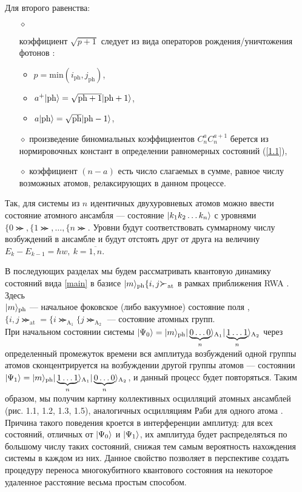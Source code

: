 Для второго равенства:
\begin{itemize}
	\item[$\diamond$]{
		коэффициент $\sqrt{p+1}$ следует из вида операторов рождения/уничтожения фотонов \cite{messia}: 
		\begin{itemize}
			\item{$p = \mathrm{min}(i_{\mathrm{ph}}, j_{\mathrm{ph}})$,}
			\item{$a^{+}|\mathrm{ph}\rangle = \sqrt{\mathrm{ph} + 1}|\mathrm{ph} + 1\rangle$,}
			\item{$a|\mathrm{ph}\rangle = \sqrt{\mathrm{ph}}|\mathrm{ph-1}\rangle$,}
		\end{itemize}
	}
	\item[$\diamond$]{ 
		произведение биномиальных коэффициентов $C_{n}^{a}C_{n}^{a+1}$ берется из нормировочных констант в определении 	равномерных состояний (\ref{1.1})},
	\item[$\diamond$]{
		коэффициент $(n-a)$ есть число слагаемых в сумме, равное числу возможных атомов, релаксирующих в данном процессе.}
\end{itemize}

Так, для системы из $n$ идентичных двухуровневых атомов можно ввести состояние атомного ансамбля --- состояние $|k_{1}k_{2}\dots k_{n}\rangle$ с уровнями $\{0\Succ, \{1\Succ, \dots, \{n\Succ$. Уровни будут соответствовать суммарному числу возбуждений в ансамбле и будут отстоять друг от друга на величину $E_{k} - E_{k-1} = \hbar w,\ k = \overline{1,n}$.

В последующих разделах мы будем рассматривать квантовую динамику состояний вида \eqref{main} в базисе $|m\ra_{\mathrm{ph}}\{i,j\Succ_{\mathrm{at}}$ в рамках приближения RWA \cite{ozhigov_qq,rwa_rabi_1,rwa_rabi_2}.
\\
\noindent Здесь\\
\indent$|m\rangle_{\mathrm{ph}}$ --- начальное фоковское (либо вакуумное) состояние поля \cite{landau,belousov,messia},
\\[6pt]
\indent$\{i,j\Succ_{\mathrm{at}}\!=\!\{i\Succ_{\mathrm{A_{1}}}\{j\Succ_{\mathrm{A_{2}}}$ --- состояние атомных групп.
\
\\[6pt]
\noindent При начальном состоянии системы $|\Psi_0\rangle=|m\rangle_{\mathrm{ph}}|\protect\underbrace{0\dots0}_{n}\rangle_{\mathrm{A_{1}}} |\protect\underbrace{1\dots1}_{n}\rangle_{\mathrm{A_{2}}}$ через определенный промежуток времени вся амплитуда возбуждений одной группы атомов сконцентрируется на возбуждении другой группы атомов --- состоянии $|\Psi_1\rangle=|m\rangle_{\mathrm{ph}}|\protect\underbrace{1\dots1}_{n}\rangle_{\mathrm{A_{1}}} |\protect\underbrace{0\dots0}_{n}\rangle_{\mathrm{A_{2}}}$, и данный процесс будет повторяться. Таким образом, мы получим картину коллективных осцилляций атомных ансамблей ({\color{red}рис. 1.1, 1.2, 1.3, 1.5}), аналогичных осцилляциям Раби для одного атома \cite{rabi_1,rabi_2,rabi_3}. Причина такого поведения кроется в интерференции амплитуд: для всех состояний, отличных от $|\Psi_{0}\rangle$ и $|\Psi_{1}\rangle$, их амплитуда будет распределяться по большому числу таких состояний, снижая тем самым вероятность нахождения системы в каждом из них. Данное свойство позволяет в перспективе создать процедуру переноса многокубитного квантового состояния на некоторое удаленное расстояние весьма простым способом.


